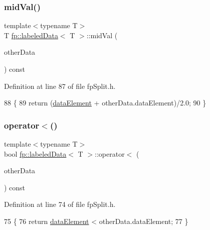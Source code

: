 \subsubsection{\texorpdfstring{mid\+Val()}{midVal()}}
{\footnotesize\ttfamily template$<$typename T$>$ \\
T \hyperlink{classfp_1_1labeledData}{fp\+::labeled\+Data}$<$ T $>$\+::mid\+Val (\begin{DoxyParamCaption}\item[{const \hyperlink{classfp_1_1labeledData}{labeled\+Data}$<$ T $>$ \&}]{other\+Data }\end{DoxyParamCaption}) const\hspace{0.3cm}{\ttfamily [inline]}}



Definition at line 87 of file fp\+Split.\+h.


\begin{DoxyCode}
88                 \{
89                     \textcolor{keywordflow}{return} (\hyperlink{classfp_1_1labeledData_a02564fc812e8a1f4d4ca6edab114d246}{dataElement} + otherData.dataElement)/2.0;
90                 \}
\end{DoxyCode}
\mbox{\label{classfp_1_1labeledData_a18a9d8880e5789ae4674ce2c675d74b3}} 
\subsubsection{\texorpdfstring{operator$<$()}{operator<()}}
{\footnotesize\ttfamily template$<$typename T$>$ \\
bool \hyperlink{classfp_1_1labeledData}{fp\+::labeled\+Data}$<$ T $>$\+::operator$<$ (\begin{DoxyParamCaption}\item[{const \hyperlink{classfp_1_1labeledData}{labeled\+Data}$<$ T $>$ \&}]{other\+Data }\end{DoxyParamCaption}) const\hspace{0.3cm}{\ttfamily [inline]}}



Definition at line 74 of file fp\+Split.\+h.


\begin{DoxyCode}
75                 \{
76                     \textcolor{keywordflow}{return} \hyperlink{classfp_1_1labeledData_a02564fc812e8a1f4d4ca6edab114d246}{dataElement} < otherData.dataElement;
77                 \}
\end{DoxyCode}
\mbox{\label{classfp_1_1labeledData_a63eca05703f41a3f747c0cfe1b89731e}} 
